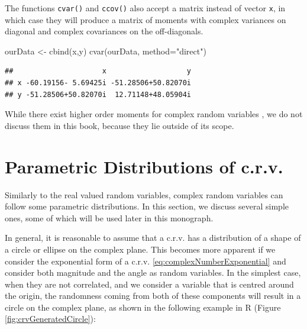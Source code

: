 \documentclass[
]{book}
\newenvironment{Shaded}{\begin{snugshade}}{\end{snugshade}}
\newcommand{\AttributeTok}[1]{\textcolor[rgb]{0.77,0.63,0.00}{#1}}
\newcommand{\FunctionTok}[1]{\textcolor[rgb]{0.00,0.00,0.00}{#1}}
\newcommand{\NormalTok}[1]{#1}
\newcommand{\OtherTok}[1]{\textcolor[rgb]{0.56,0.35,0.01}{#1}}
\newcommand{\StringTok}[1]{\textcolor[rgb]{0.31,0.60,0.02}{#1}}
\begin{document}
The functions \texttt{cvar()} and \texttt{ccov()} also accept a matrix instead of vector \texttt{x}, in which case they will produce a matrix of moments with complex variances on diagonal and complex covariances on the off-diagonals.

\begin{Shaded}
\begin{Highlighting}[]
\NormalTok{ourData }\OtherTok{\textless{}{-}} \FunctionTok{cbind}\NormalTok{(x,y)}
\FunctionTok{cvar}\NormalTok{(ourData, }\AttributeTok{method=}\StringTok{"direct"}\NormalTok{)}
\end{Highlighting}
\end{Shaded}

\begin{verbatim}
##                     x                   y
## x -60.19156- 5.69425i -51.28506+50.82070i
## y -51.28506+50.82070i  12.71148+48.05904i
\end{verbatim}

While there exist higher order moments for complex random variables \citep[see, for example,][]{Javidi2011}, we do not discuss them in this book, because they lie outside of its scope.

\hypertarget{parametric-distributions-of-c.r.v.}{%
\section{Parametric Distributions of c.r.v.}\label{parametric-distributions-of-c.r.v.}}

Similarly to the real valued random variables, complex random variables can follow some parametric distributions. In this section, we discuss several simple ones, some of which will be used later in this monograph.

In general, it is reasonable to assume that a c.r.v. has a distribution of a shape of a circle or ellipse on the complex plane. This becomes more apparent if we consider the exponential form of a c.r.v. \eqref{eq:complexNumberExponential} and consider both magnitude and the angle as random variables. In the simplest case, when they are not correlated, and we consider a variable that is centred around the origin, the randomness coming from both of these components will result in a circle on the complex plane, as shown in the following example in R (Figure \ref{fig:crvGeneratedCircle}):
\end{document}
